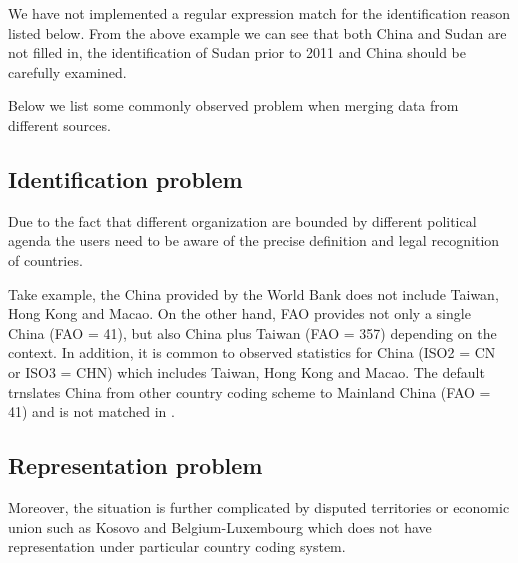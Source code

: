 \documentclass[nojss]{jss}\usepackage{graphicx, color}
\begin{document}
We have not implemented a regular expression match for the
identification reason listed below. From the above example we can see
that both China and Sudan are not filled in, the identification of
Sudan prior to 2011 and China should be carefully examined.


Below we list some commonly observed problem when merging data from
different sources.

\subsection{Identification problem}
Due to the fact that different organization are bounded by different
political agenda the users need to be aware of the precise definition
and legal recognition of countries.

Take example, the China provided by the World Bank does not include
Taiwan, Hong Kong and Macao. On the other hand, FAO provides not only
a single China (FAO = 41), but also China plus Taiwan (FAO = 357)
depending on the context. In addition, it is common to observed
statistics for China (ISO2 = CN or ISO3 = CHN) which includes Taiwan,
Hong Kong and Macao. The default trnslates China from other country
coding scheme to Mainland China (FAO = 41) and is not matched in
.

\subsection{Representation problem}
Moreover, the situation is further complicated by disputed territories
or economic union such as Kosovo and Belgium-Luxembourg which does not
have representation under particular country coding system.
\end{document}
